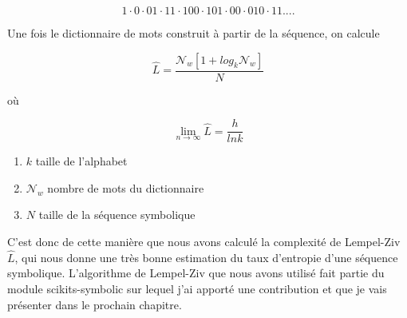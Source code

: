 \begin{equation}
    1 \cdot 0 \cdot 01 \cdot 11 \cdot 100 \cdot 101 \cdot 00 \cdot 010 \cdot 11... .
\end{equation}

Une fois le dictionnaire de mots construit à partir de la séquence, on calcule 

\begin{equation}
    \hat{L} = \frac{\mathcal{N}_w[1 + log_k\mathcal{N}_w]}{N}
\end{equation}

où

\begin{equation}
    \lim_{n \to \infty} \hat{L} = \frac{h}{lnk} \label{eq:lempelziv}
\end{equation}

\begin{enumerate}
	\item $k$ taille de l'alphabet
	\item $\mathcal{N}_w$ nombre de mots du dictionnaire
	\item $N$ taille de la séquence symbolique
\end{enumerate}

C'est donc de cette manière que nous avons calculé la complexité de Lempel-Ziv $\hat{L}$, qui nous donne une très bonne estimation du taux d'entropie d'une séquence symbolique. L'algorithme de Lempel-Ziv que nous avons utilisé fait partie du module scikits-symbolic sur lequel j'ai apporté une contribution et que je vais présenter dans le prochain chapitre.
